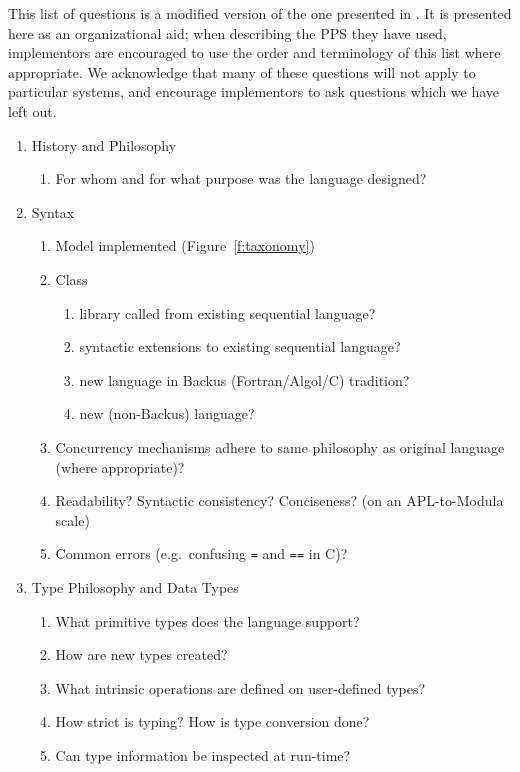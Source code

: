 This list of questions is a modified version of the one presented in \cite{b:compare-ada-c-pascal}.
It is presented here as an organizational aid;
when describing the PPS they have used,
implementors are encouraged to use the order and terminology of this list where appropriate.
We acknowledge that many of these questions will not apply to particular systems,
and encourage implementors to ask questions which we have left out.

\begin{small}
\begin{enumerate}
\item History and Philosophy
  \begin{enumerate}
  \item For whom and for what purpose was the language designed?
  \end{enumerate}
\item Syntax
  \begin{enumerate}
  \item Model implemented (Figure~\ref{f:taxonomy})
  \item Class
    \begin{enumerate}
    \item library called from existing sequential language?
    \item syntactic extensions to existing sequential language?
    \item new language in Backus (Fortran/Algol/C) tradition?
    \item new (non-Backus) language?
    \end{enumerate}
  \item Concurrency mechanisms adhere to same philosophy as original
	language (where appropriate)?
  \item Readability?  Syntactic consistency?  Conciseness?
	(on an APL-to-Modula scale)
  \item Common errors (e.g.\ confusing {\tt{=}} and {\tt{==}} in C)?
  \end{enumerate}
\item Type Philosophy and Data Types
  \begin{enumerate}
  \item What primitive types does the language support?
  \item How are new types created?
  \item What intrinsic operations are defined on user-defined types?
  \item How strict is typing?
	How is type conversion done?
  \item Can type information be inspected at run-time?

\end{enumerate}
\end{enumerate}
\end{small}
